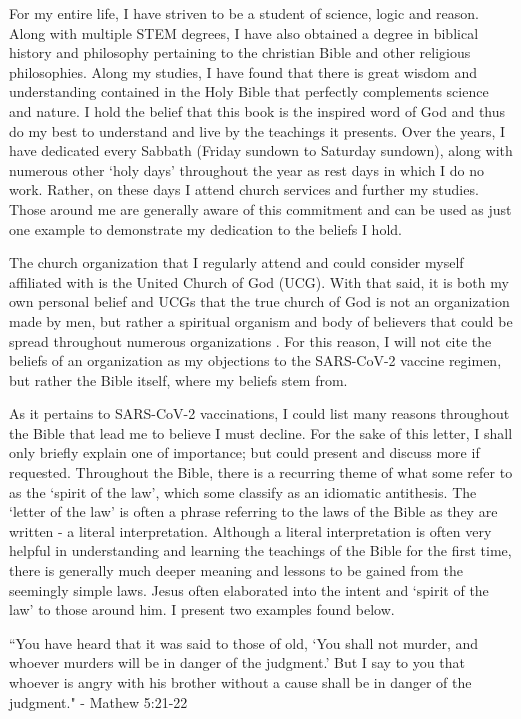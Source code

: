 \documentclass[10pt, a4paper, twocolumn]{book}
\begin{document}
For my entire life, I have striven to be a student of science, logic and reason. Along with multiple STEM degrees, I have also obtained a degree in biblical history and philosophy pertaining to the christian Bible and other religious philosophies. Along my studies, I have found that there is great wisdom and understanding contained in the Holy Bible that perfectly complements science and nature. I hold the belief that this book is the inspired word of God and thus do my best to understand and live by the teachings it presents. Over the years, I have dedicated every Sabbath (Friday sundown to Saturday sundown), along with numerous other `holy days' throughout the year as rest days in which I do no work. Rather, on these days I attend church services and further my studies. Those around me are generally aware of this commitment and can be used as just one example to demonstrate my dedication to the beliefs I hold.

The church organization that I regularly attend and could consider myself affiliated with is the United Church of God (UCG). With that said, it is both my own personal belief and UCGs that the true church of God is not an organization made by men, but rather a spiritual organism and body of believers that could be spread throughout numerous organizations \citep{UCG:fundamentalBeliefs}. For this reason, I will not cite the beliefs of an organization as my objections to the SARS-CoV-2 vaccine regimen, but rather the Bible itself, where my beliefs stem from. 

As it pertains to SARS-CoV-2 vaccinations, I could list many reasons throughout the Bible that lead me to believe I must decline. For the sake of this letter, I shall only briefly explain one of importance; but could present and discuss more if requested. Throughout the Bible, there is a recurring theme of what some refer to as the `spirit of the law', which some classify as an idiomatic antithesis. The `letter of the law' is often a phrase referring to the laws of the Bible as they are written - a literal interpretation. Although a literal interpretation is often very helpful in understanding and learning the teachings of the Bible for the first time, there is generally much deeper meaning and lessons to be gained from the seemingly simple laws. Jesus often elaborated into the intent and `spirit of the law' to those around him. I present two examples found below.

\begin{formal}
	``You have heard that it was said to those of old, `You shall not murder, and whoever murders will be in danger of the judgment.' But I say to you that whoever is angry with his brother without a cause shall be in danger of the judgment." - Mathew 5:21-22
\end{formal}
\end{document}
